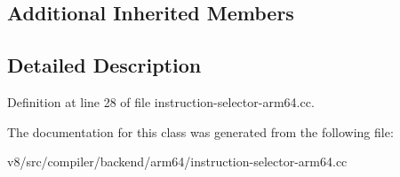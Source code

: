 \subsection*{Additional Inherited Members}


\subsection{Detailed Description}


Definition at line 28 of file instruction-\/selector-\/arm64.\+cc.



The documentation for this class was generated from the following file\+:\begin{DoxyCompactItemize}
\item 
v8/src/compiler/backend/arm64/instruction-\/selector-\/arm64.\+cc\end{DoxyCompactItemize}
